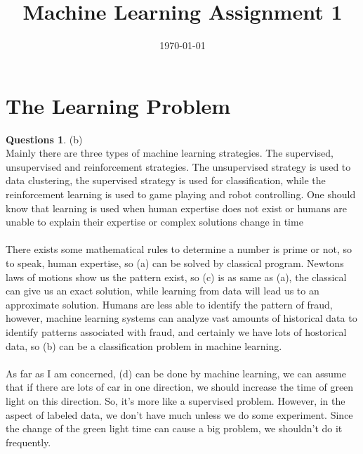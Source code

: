 \documentclass[a4paper,11pt]{article}
\title{Machine Learning Assignment 1}
\author{\bsc{Gansheng TAN }}
\date{\today}
\theoremstyle{definition}
\newtheorem{quests}{Questions}
\begin{document}
\maketitle

\section{The Learning Problem}
\begin{quests}
(b)\\
Mainly there are three types of machine learning strategies. The supervised, unsupervised
and reinforcement strategies. The unsupervised strategy is used to data clustering, the supervised strategy is used for classification, while the reinforcement learning is used to game playing and robot controlling. One should know that learning is used when human expertise does not exist or humans are unable to explain their expertise or complex solutions change in time\\
\\
There exists some mathematical rules to determine a number is prime or not, so to speak, human expertise, so (a) can be solved by classical program. Newtons laws of motions show us the pattern exist, so (c) is as same as (a), the classical can give us an exact solution, while learning from data will lead us to an approximate solution.
Humans are less able to identify the pattern of fraud, however, machine learning systems can analyze vast amounts of historical data to identify patterns associated with fraud, and certainly we have lots of hostorical data, so (b) can be a classification problem in machine learning.\\
\\
As far as I am concerned, (d) can be done by machine learning, we can assume that if there are lots of car in one direction, we should increase the time of green light on this direction. So, it's more like a supervised problem. However, in the aspect of labeled data, we don't have much unless we do some experiment. Since the change of the green light time can cause a big problem, we shouldn't do it frequently.
\end{quests}

\newpage
\end{document}
